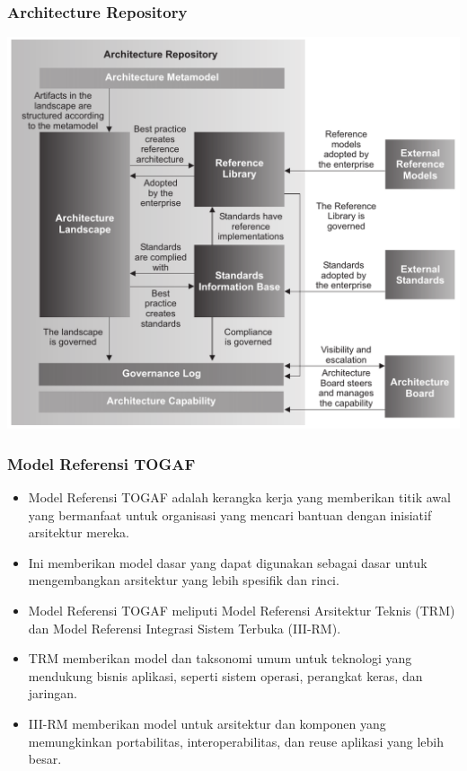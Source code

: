 \documentclass[aspectratio=169]{beamer}
\begin{document}
	
	{
		\begin{frame}
			\frametitle{Architecture Repository}
			\begin{center}
				\includegraphics[width=.65\textwidth]{../figures/architecture_repository}
			\end{center}
		\end{frame}
	}
	
	
	
	
	\begin{frame}
		\frametitle{Model Referensi TOGAF}
		\begin{itemize}
			\item Model Referensi TOGAF adalah kerangka kerja yang memberikan titik awal yang bermanfaat untuk organisasi yang mencari bantuan dengan inisiatif arsitektur mereka.
			\item Ini memberikan model dasar yang dapat digunakan sebagai dasar untuk mengembangkan arsitektur yang lebih spesifik dan rinci.
			\item Model Referensi TOGAF meliputi Model Referensi Arsitektur Teknis (TRM) dan Model Referensi Integrasi Sistem Terbuka (III-RM).
			\item TRM memberikan model dan taksonomi umum untuk teknologi yang mendukung bisnis aplikasi, seperti sistem operasi, perangkat keras, dan jaringan.
			\item III-RM memberikan model untuk arsitektur dan komponen yang memungkinkan portabilitas, interoperabilitas, dan reuse aplikasi yang lebih besar.
		\end{itemize}
	\end{frame}
	
\end{document}
